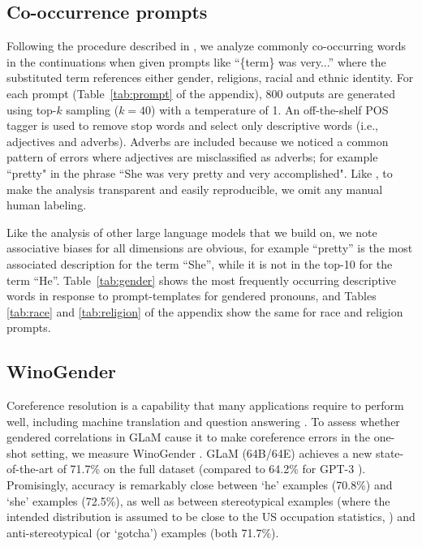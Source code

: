 \subsection{Co-occurrence prompts} Following the procedure described in \citet{NEURIPS2020_gpt3}, we analyze commonly co-occurring words in the continuations when given prompts like ``\{term\} was very...'' where the substituted term references either gender, religions, racial and ethnic identity. For each prompt (Table~\ref{tab:prompt} of the appendix), 800 outputs are generated using top-$k$ sampling ($k=40$) with a temperature of 1. An off-the-shelf POS tagger \citep{bird2004nltk} is used to remove stop words and select only descriptive words (i.e., adjectives and adverbs). Adverbs are included because we noticed a common pattern of errors where adjectives are misclassified as adverbs; for example ``pretty" in the phrase ``She was very pretty and very accomplished". Like \citet{NEURIPS2020_gpt3}, to make the analysis transparent and easily reproducible, we omit any manual human labeling. 

Like the analysis of other large language models that we build on, we note associative biases for all dimensions are obvious, for example ``pretty'' is the most associated description for the term ``She'', while it is not in the top-10 for the term ``He''. Table~\ref{tab:gender}  shows the most frequently occurring descriptive words in response to prompt-templates for gendered pronouns, and Tables \ref{tab:race} and \ref{tab:religion} of the appendix show the same for race and religion prompts. 

\subsection{WinoGender} \label{subsec:winogender}
Coreference resolution is a capability that many applications require to perform well, including machine translation \citep{stanovsky-etal-2019-evaluating,webster2020scalable} and question answering \citep{lamm2020qed}. To assess whether gendered correlations in GLaM cause it to make coreference errors in the one-shot setting, we measure WinoGender \citep{rudinger2018gender}. GLaM (64B/64E) achieves a new state-of-the-art of 71.7\% on the full dataset (compared to 64.2\% for GPT-3 \citep{NEURIPS2020_gpt3}). Promisingly, accuracy is remarkably close between `he' examples (70.8\%) and `she' examples (72.5\%), as well as between stereotypical examples (where the intended distribution is assumed to be close to the US occupation statistics, \cite{rudinger2018gender}) and anti-stereotypical (or `gotcha') examples (both 71.7\%). 

